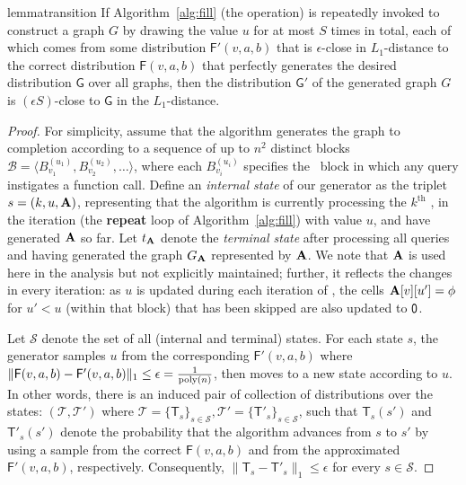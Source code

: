 \begin{restatable}{lemma}{transition}\label{lemma:transition}
If Algorithm~\ref{alg:fill} (the  operation) is repeatedly invoked to construct a graph $G$ by drawing the value $u$ for at most $S$ times in total, each of which comes from some distribution $\mathsf{F}'(v,a,b)$ that is $\epsilon$-close in $L_1$-distance to the correct distribution $\mathsf{F}(v,a,b)$ that perfectly generates the desired distribution $\mathsf{G}$ over all graphs, then the distribution $\mathsf{G}'$ of the generated graph $G$ is $(\epsilon S)$-close to $\mathsf{G}$ in the $L_1$-distance.
\end{restatable}
\begin{proof}
\label{proof:transition}
For simplicity, assume that the algorithm generates the graph to completion according to a sequence of up to $n^2$ distinct blocks $\mathcal{B} = \langle B^{(u_1)}_{v_1}, B^{(u_2)}_{v_2}, \ldots \rangle$, where each $B^{(u_i)}_{v_i}$ specifies the \unfilled~block in which any query instigates a  function call. Define an \emph{internal state} of our generator as the triplet $s = (k, u, \mathbf{A})$, representing that the algorithm is currently processing the $k^\textrm{th}$ , in the iteration (the \textbf{repeat} loop of Algorithm~\ref{alg:fill}) with value $u$, and have generated $\mathbf{A}$ so far. Let $t_{\mathbf{A}}$ denote the \emph{terminal state} after processing all queries and having generated the graph $G_{\mathbf{A}}$ represented by $\mathbf{A}$. We note that $\mathbf{A}$ is used here in the analysis but not explicitly maintained; further, it reflects the changes in every iteration: as $u$ is updated during each iteration of , the cells $\mathbf{A}[v][u'] = \phi$ for $u' < u$ (within that block) that has been skipped are also updated to $\mathsf{0}$.

Let $\mathcal{S}$ denote the set of all (internal and terminal) states. For each state $s$, the generator samples $u$ from the corresponding $\mathsf{F}'(v,a,b)$ where $\|\mathsf{F}(v,a,b)-\mathsf{F}'(v,a,b)\|_1 \leq \epsilon = \frac{1}{\mathrm{poly}(n)}$, then moves to a new state according to $u$. In other words, there is an induced pair of collection of distributions over the states: $(\mathcal{T},\mathcal{T}')$ where $\mathcal{T}=\{\mathsf{T}_s\}_{s\in\mathcal{S}}, \mathcal{T}'=\{\mathsf{T}'_s\}_{s\in\mathcal{S}}$, such that $\mathsf{T}_s(s')$ and $\mathsf{T}'_s(s')$ denote the probability that the algorithm advances from $s$ to $s'$ by using a sample from the correct $\mathsf{F}(v,a,b)$ and from the approximated $\mathsf{F}'(v,a,b)$, respectively. Consequently, $\|\mathsf{T}_s-\mathsf{T}'_s\|_1 \leq \epsilon$ for every $s\in\mathcal{S}$.


\end{proof}
